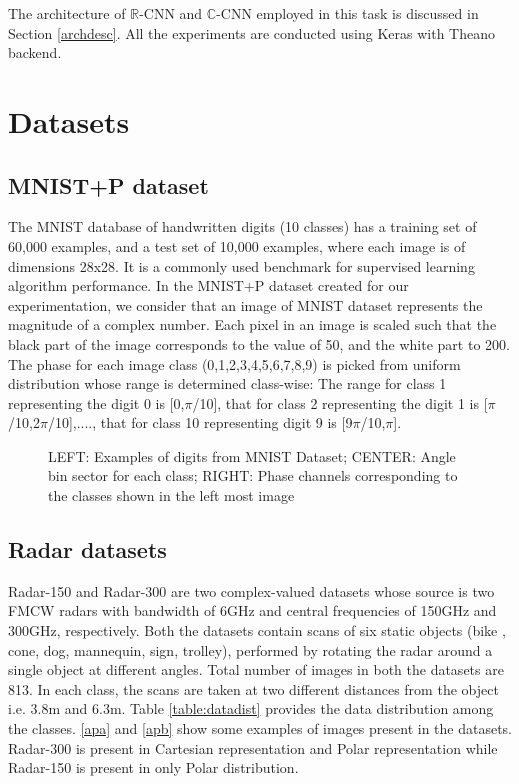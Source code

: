  The architecture of $\mathbb{R}$-CNN and $\mathbb{C}$-CNN employed in this task is discussed in Section \ref{archdesc}.  All the experiments are conducted using Keras \cite{chollet2015keras} with Theano \cite{theano} backend.
 
 
 \section{Datasets}\label{datasets}
 
 
 \subsection{MNIST+P dataset}\label{data-mnistp}
 The MNIST database of handwritten digits (10 classes) has a training set of 60,000 examples, and a test set of 10,000 examples, where each image is of dimensions 28x28. It is a commonly used benchmark for supervised learning algorithm performance. In the MNIST+P dataset created for our experimentation, we consider that an image of MNIST dataset represents the magnitude of a complex number. Each pixel in an image is scaled such that the black part of the image corresponds to the value of 50, and the white part to 200. The phase for each image class (0,1,2,3,4,5,6,7,8,9) is picked from uniform distribution whose range is determined class-wise: The range for class 1 representing the digit 0 is [0,$\pi$/10], that for class 2 representing the digit 1 is [$\pi$/10,2$\pi$/10],...., that for class 10 representing digit 9 is [9$\pi$/10,$\pi$]. 
 
   \begin{figure}[htb]
	\centering
	\epsfxsize=14cm
	{}\caption{LEFT: Examples of digits from MNIST Dataset; CENTER: Angle bin sector for each class; RIGHT: Phase channels corresponding to the classes shown in the left most image \cite{mnistimage}}
\label{fig:blocks}
\end{figure}
 
 \subsection{Radar datasets}\label{data-radar}
 
 Radar-150 and Radar-300 are two complex-valued datasets whose source is two FMCW radars with bandwidth of 6GHz and central frequencies of 150GHz and 300GHz, respectively.
 Both the datasets contain scans of six static objects (bike , cone, dog, mannequin, sign, trolley), performed by rotating the radar around a single object at different angles. Total number of images in both the datasets are 813. In each class, the scans are taken at two different distances from the object i.e. 3.8m and 6.3m. Table \ref{table:datadist} provides the data distribution among the classes. \ref{apa} and \ref{apb} show some examples of images present in the datasets. Radar-300 is present in Cartesian representation and Polar representation while Radar-150 is present in only Polar distribution. 
 
